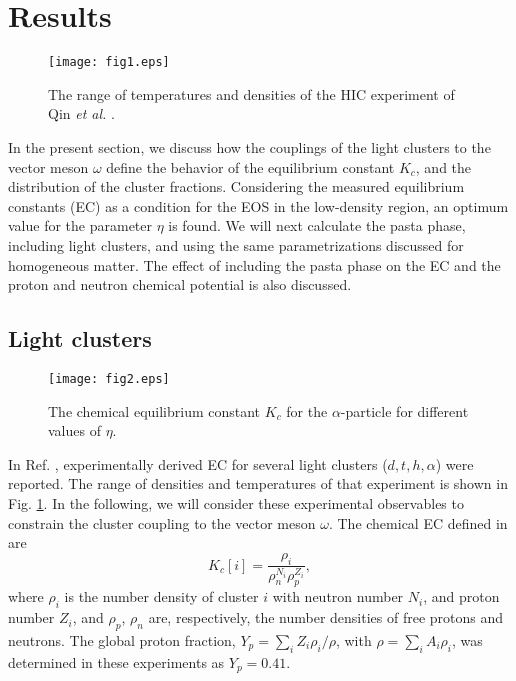 \documentclass[aps,prc,nofootinbib,twocolumn,showpacs]{revtex4-1}
\begin{document}
\section{Results}
\label{sec:results}

\begin{figure}[thb]
    \texttt{[image: fig1.eps]}
    \caption{The range of temperatures and densities of the HIC experiment of Qin \textit{et al.} \cite{qin12}.}
\label{fig1}
\end{figure}

In the present section, we discuss how the  couplings of the light clusters to
the vector meson $\omega$ define the behavior of the equilibrium constant
$K_c$,  and the distribution of the cluster fractions. Considering the measured  equilibrium constants
(EC) \cite{qin12} as a condition for the EOS in the low-density region, 
an optimum value for the parameter $\eta$ is found. We will next calculate
the pasta phase, including light clusters, and using the same
parametrizations discussed for homogeneous matter. The effect of
including the pasta phase on the EC and the proton
and neutron chemical potential is also discussed. 


\subsection{Light clusters}



\begin{figure}[thb]
    \texttt{[image: fig2.eps]}
    \caption{The chemical equilibrium constant $K_c$ for the $\alpha$-particle for different values of $\eta$.}
\label{fig2}
\end{figure}


In Ref. \cite{qin12},  experimentally derived EC for several light clusters ($d, t, h,\alpha$) were reported. 
The range of densities and temperatures of that experiment is shown in Fig. \ref{fig1}.
In the following, we will consider these experimental observables to 
constrain the cluster coupling to the vector meson $\omega$. The chemical EC  defined in \cite{qin12} are
\begin{equation}
K_c[i]=\frac{\rho_i}{\rho_n^{N_i}\rho_p^{Z_i}},
\label{kc}
\end{equation}
where $\rho_i$ is the number density of cluster $i$ with neutron
number $N_i$,  and  proton number $Z_i$, and $\rho_p$,
$\rho_n$ are, respectively, the number densities of free protons and neutrons.
The global proton fraction, $Y_p=\sum_i Z_i \rho_i/\rho$, with $ \rho =\sum_i A_i \rho_i$,
was determined in these experiments as $Y_p=0.41$.
\end{document}
